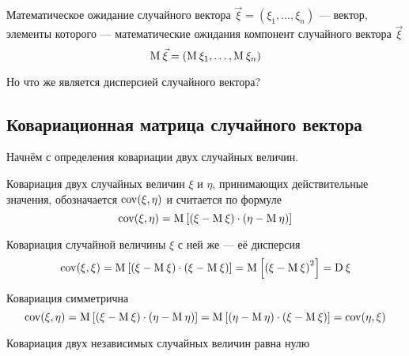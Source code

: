 \begin{definition}
  Математическое ожидание случайного вектора
  $\vec{\xi} = \left( \xi_1, \dots, \xi_n \right)$ --- вектор,
  элементы которого --- математические ожидания компонент
  случайного вектора $\vec{\xi}$
  $$\operatorname{M}_{} \vec{\xi} = \left( \operatorname{M}_{} \xi_1, \dots, \operatorname{M}_{} \xi_n \right)$$
\end{definition}

Но что же является дисперсией случайного вектора?

\subsection{Ковариационная матрица случайного вектора}

Начнём с определения ковариации двух случайных величин.

\begin{definition}[Ковариация]
  Ковариация двух случайных величин $\xi$ и $\eta$, принимающих действительные
  значения, обозначается $\operatorname{cov}\!\left( \xi, \eta \right)$ и считается по формуле
  $$\operatorname{cov}\!\left( \xi, \eta \right)
      = \operatorname{M}_{} \left[ \left( \xi - \operatorname{M}_{} \xi \right)
      \cdot \left( \eta - \operatorname{M}_{} \eta \right) \right]$$
\end{definition}

\begin{remark}
  Ковариация случайной величины $\xi$ с ней же --- её дисперсия
  $$\operatorname{cov}\!\left( \xi, \xi \right)
      = \operatorname{M}_{} \left[ \left( \xi - \operatorname{M}_{} \xi \right)
      \cdot \left( \xi - \operatorname{M}_{} \xi \right) \right]
      = \operatorname{M}_{} \left[ \left( \xi - \operatorname{M}_{} \xi \right)^2 \right]
      = \operatorname{D}_{} \xi$$
\end{remark}

\begin{remark}
  Ковариация симметрична
  $$\operatorname{cov}\!\left( \xi, \eta \right)
      = \operatorname{M}_{} \left[ \left( \xi - \operatorname{M}_{} \xi \right)
      \cdot \left( \eta - \operatorname{M}_{} \eta \right) \right]
      = \operatorname{M}_{} \left[ \left( \eta - \operatorname{M}_{} \eta \right)
      \cdot \left( \xi - \operatorname{M}_{} \xi \right) \right]
      =\operatorname{cov}\!\left( \eta, \xi \right)$$
\end{remark}

\begin{remark}\label{rem:covIndepentent}
  Ковариация двух независимых случайных величин равна нулю
  \cite[с.~244]{Feller1}
\end{remark}

